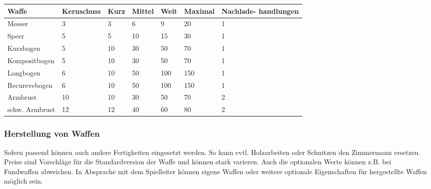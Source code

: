 \documentclass{article}
\begin{document}
\begin{small}
\begin{tabular}{|m{25mm}|m{20mm}|m{15mm}|m{15mm}|m{15mm}|m{15mm}|m{20mm}|}
\hline
\textbf{Waffe}&\textbf{Kernschuss}&\textbf{Kurz}&\textbf{Mittel}&\textbf{Weit}&\textbf{Maximal}&\textbf{Nachlade- handlungen}\\
\hline
\hline
Messer&3&3&6&9&20&1\\
\hline
Speer&5&5&10&15&30&1\\
\hline
Kurzbogen&5&10&30&50&70&1\\
\hline
Kompositbogen&5&10&30&50&70&1\\
\hline
Langbogen&6&10&50&100&150&1\\
\hline
Recurevebogen&6&10&50&100&150&1\\
\hline
Armbrust&10&10&30&50&70&2\\
\hline
schw. Armbrust&12&12&40&60&80&2\\
\hline
\end{tabular}
\end{small}

\subsubsection{Herstellung von Waffen}

Sofern passend können auch andere Fertigkeiten eingesetzt werden. So kann evtl. Holzarbeiten oder Schnitzen den Zimmermann
ersetzen. Preise sind Vorschläge für die Standardversion der Waffe und können stark varieren. Auch die optionalen
Werte können z.B. bei Fundwaffen abweichen. In Absprache mit dem Spielleiter können eigene Waffen oder weitere optionale
Eigenschaften für hergestellte Waffen möglich sein.
\end{document}
